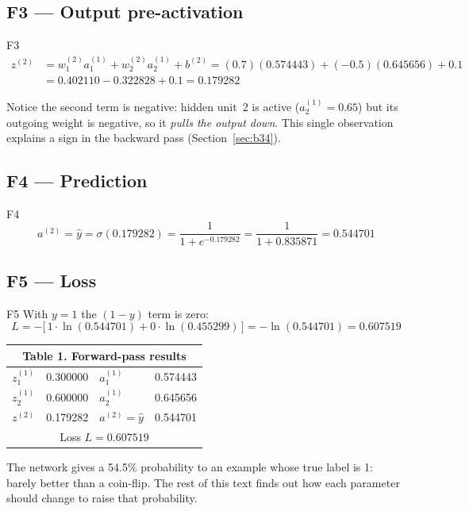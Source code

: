 \documentclass[11pt]{article}
\begin{document}
\subsection{F3 --- Output pre-activation}
\begin{example}{F3}
\begin{align*}
z^{(2)}&=w^{(2)}_1a^{(1)}_1+w^{(2)}_2a^{(1)}_2+b^{(2)}=(0.7)(0.574443)+(-0.5)(0.645656)+0.1\\
&=0.402110-0.322828+0.1=\mathbf{0.179282}
\end{align*}
\end{example}
Notice the second term is negative: hidden unit~2 is active ($a^{(1)}_2=0.65$) but its outgoing weight is negative, so it \emph{pulls the output down}. This single observation explains a sign in the backward pass (Section~\ref{sec:b34}).

\subsection{F4 --- Prediction}
\begin{example}{F4}
\[
a^{(2)}=\hat y=\sigma(0.179282)=\frac{1}{1+e^{-0.179282}}=\frac{1}{1+0.835871}=\mathbf{0.544701}
\]
\end{example}

\subsection{F5 --- Loss}
\begin{example}{F5}
With $y=1$ the $(1-y)$ term is zero:
\[
L=-\bigl[\,1\cdot\ln(0.544701)+0\cdot\ln(0.455299)\,\bigr]=-\ln(0.544701)=\mathbf{0.607519}
\]
\end{example}

\begin{center}\renewcommand{\arraystretch}{1.25}
\begin{tabular}{lrlr}
\toprule
\multicolumn{4}{c}{\textbf{Table 1. Forward-pass results}}\\
\midrule
$z^{(1)}_1$&0.300000&$a^{(1)}_1$&0.574443\\
$z^{(1)}_2$&0.600000&$a^{(1)}_2$&0.645656\\
$z^{(2)}$&0.179282&$a^{(2)}=\hat y$&0.544701\\
\midrule
\multicolumn{4}{c}{Loss $L=0.607519$}\\
\bottomrule
\end{tabular}
\end{center}
The network gives a 54.5\% probability to an example whose true label is 1: barely better than a coin-flip. The rest of this text finds out how each parameter should change to raise that probability.
\end{document}
